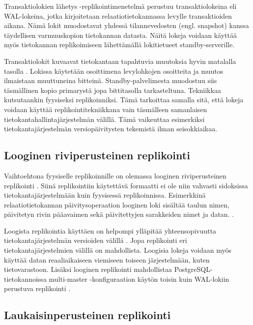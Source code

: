 \documentclass[finnish,twoside,censored,csm,sw-track-2018]{HYthesisML}
\begin{document}
Transaktiolokien lähetys -replikointimenetelmä perustuu transaktiolokeina eli WAL-lokeina, jotka kirjoitetaan relaatiotietokannassa levylle transaktioiden aikana. Nämä lokit muodostavat yhdessä tilannevedosten (engl. snapshot) kanssa täydellisen varmuuskopion tietokannan datasta. Näitä lokeja voidaan käyttää myös tietokannan replikoimiseen lähettämällä lokitietueet standby-serverille. \cite{Kleppmann}

Transaktiolokit kuvaavat tietokantaan tapahtuvia muutoksia hyvin matalalla tasolla \citep{Kleppmann}. Lokissa käytetään osoittimena levylohkojen osoitteita ja muutos ilmaistaan muuttuneina bitteinä. Standby-palvelimesta muodostuu siis täsmällinen kopio primarystä jopa bittitasolla tarkasteltuna. Tekniikkaa kutsutaankin fyysiseksi replikoinniksi. Tämä tarkoittaa samalla sitä, että lokeja voidaan käyttää replikointitekniikkana vain täsmälleen samanlaisen tietokantahallintajärjestelmän välillä. Tämä vaikeuttaa esimerkiksi tietokantajärjestelmän versiopäivitysten tekemistä ilman seisokkiaikaa.

\subsection{Looginen riviperusteinen replikointi}

Vaihtoehtona fyysiselle replikoinnille on olemassa looginen riviperusteinen replikointi \citep{Kleppmann}. Siinä replikointiin käytettävä formaatti ei ole niin vahvasti sidoksissa tietokantajärjestelmään kuin fyysisessä replikoinnissa. Esimerkkinä relaatiotietokannan päivitysoperaation looginen loki sisältää taulun nimen, päivitetyn rivin pääavaimen sekä päivitettyjen sarakkeiden nimet ja datan. \citep{postgres-replication-solutions}.

Loogista replikointia käyttäen on helpompi ylläpitää yhteensopivuutta tietokantajärjestelmän versioiden välillä \citep{Kleppmann}. Jopa replikointi eri tietokantajärjestelmien välillä on mahdollista. Loogisia lokeja voidaan myös käyttää datan reaaliaikaiseen viemiseen toiseen järjestelmään, kuten tietovarastoon. Lisäksi looginen replikointi mahdollistaa PostgreSQL-tietokannoissa multi-master -konfiguraation käytön toisin kuin WAL-lokiin perustuva replikointi \citep{postgres-replication-solutions}.

\subsection{Laukaisinperusteinen replikointi}
\end{document}
